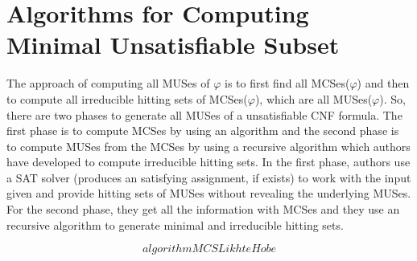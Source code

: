 \section{Algorithms for Computing Minimal Unsatisfiable Subset}
\label{sec:algorithms for computing minimal unsatisfiable subset}
The approach of computing all MUSes of $\varphi$ is to first find all MCSes($\varphi$) and then to compute all irreducible hitting sets of MCSes($\varphi$), which are all MUSes($\varphi$). So, there are two phases to generate all MUSes of a unsatisfiable CNF formula. The first phase is to compute MCSes by using an algorithm and the second phase is to compute MUSes from the MCSes by using a recursive algorithm which authors have developed to compute irreducible hitting sets.\newline
In the first phase, authors use a SAT solver (produces an satisfying assignment, if exists) to work with the input given and provide hitting sets of MUSes without revealing the underlying MUSes. For the second phase, they get all the information with MCSes and they use an recursive algorithm to generate minimal and irreducible hitting sets. 

$$algorithmMCSLikhteHobe$$
